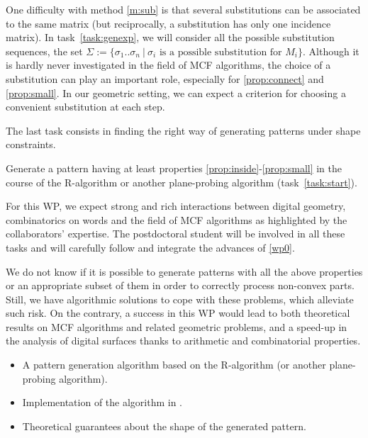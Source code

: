 One difficulty with method \ref{m:sub} is that several substitutions can be associated to the
same matrix (but reciprocally, a substitution has only one incidence matrix).
In task~\ref{task:genexp}, we will consider all the possible substitution sequences, \ie the set
$\Sigma := \{ \sigma_1..\sigma_n \ | \ \sigma_i \text{ is a possible substitution for } M_i \}$.
Although it is hardly never investigated in the field of MCF algorithms, the choice of a
substitution can play an important role, especially for \ref{prop:connect} and \ref{prop:small}.
In our geometric setting, we can expect a criterion for choosing a convenient substitution at each step. 

The last task consists in finding the right way of generating patterns under shape constraints. 

\begin{Task}
  \label{task:genpat}
  Generate a pattern having at least properties \ref{prop:inside}-\ref{prop:small} in the course of
  the R-algorithm or another plane-probing algorithm (task~\ref{task:start}). 
\end{Task}

For this WP, we expect strong and rich interactions between digital geometry, combinatorics on words
and the field of MCF algorithms as highlighted by the collaborators' expertise. The postdoctoral
student will be involved in all these tasks and will carefully follow and integrate the advances
of \ref{wp0}.


\Risks
We do not know if it is possible to generate patterns with all the above properties
or an appropriate subset of them in order to correctly process non-convex parts.
Still, we have algorithmic solutions
\cite{LPRJMIV2017} to cope with these problems, which alleviate such risk. 
On the contrary, a success in this WP would lead to both theoretical results
on MCF algorithms and related geometric problems, and a speed-up in the analysis
of digital surfaces thanks to arithmetic and combinatorial properties.  

\Success
\begin{itemize}
  \item A pattern generation algorithm based on the R-algorithm (or another plane-probing algorithm).
  \item Implementation of the algorithm in \DGtal.
  \item Theoretical guarantees about the shape of the generated pattern. 
\end{itemize}


